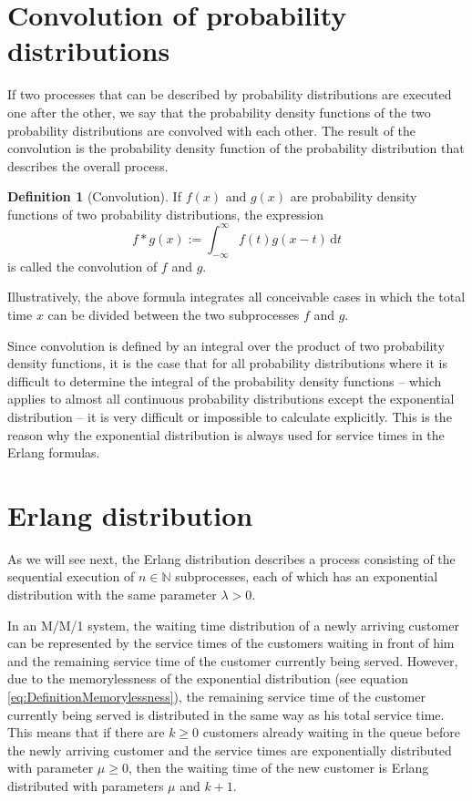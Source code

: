 \documentclass[a4paper,11pt,oneside]{article}
\theoremstyle{definition}
\newtheorem{definition}{Definition}
\begin{document}
\section{Convolution of probability distributions}

If two processes that can be described by probability distributions are executed one after the other, we say that the probability density functions of the two probability distributions are convolved with each other. The result of the convolution is the probability density function of the probability distribution that describes the overall process.

\begin{definition}[Convolution]
If $f(x)$ and $g(x)$ are probability density functions of two probability distributions, the expression
$$
f*g(x):=\int_{-\infty}^\infty f(t)g(x-t)\,\mbox{d}t
$$
is called the convolution of $f$ and $g$.
\end{definition}

Illustratively, the above formula integrates all conceivable cases in which the total time $x$ can be divided between the two subprocesses $f$ and $g$.

Since convolution is defined by an integral over the product of two probability density functions, it is the case that for all probability distributions where it is difficult to determine the integral of the probability density functions -- which applies to almost all continuous probability distributions except the exponential distribution -- it is very difficult or impossible to calculate explicitly. This is the reason why the exponential distribution is always used for service times in the Erlang formulas.



\section{Erlang distribution}\label{ErlangDistribution}

As we will see next, the Erlang distribution describes a process consisting of the sequential execution of $n\in\mathbb{N}$ subprocesses, each of which has an exponential distribution with the same parameter $\lambda>0$.

In an M/M/1 system, the waiting time distribution of a newly arriving customer can be represented by the service times of the customers waiting in front of him and the remaining service time of the customer currently being served. However, due to the memorylessness of the exponential distribution (see equation \eqref{eq:DefinitionMemorylessness}), the remaining service time of the customer currently being served is distributed in the same way as his total service time. This means that if there are $k\ge0$ customers already waiting in the queue before the newly arriving customer and the service times are exponentially distributed with parameter $\mu\ge0$, then the waiting time of the new customer is Erlang distributed with parameters $\mu$ and $k+1$.
\end{document}
